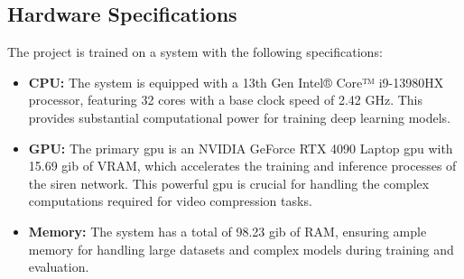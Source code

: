 \documentclass{ioereport}
\begin{document}
\subsection{Hardware Specifications}
The project is trained on a system with the following specifications:
    \begin{itemize}
        \item \textbf{CPU:} The system is equipped with a 13th Gen Intel® Core™ i9-13980HX processor, featuring 32 cores with a base clock speed of 2.42 GHz. This provides substantial computational power for training deep learning models.
        \item \textbf{GPU:} The primary \gls{gpu} is an NVIDIA GeForce RTX 4090 Laptop \gls{gpu} with 15.69 \gls{gib} of VRAM, which accelerates the training and inference processes of the \gls{siren} network. This powerful \gls{gpu} is crucial for handling the complex computations required for video compression tasks.
        \item \textbf{Memory:} The system has a total of 98.23 \gls{gib} of RAM, ensuring ample memory for handling large datasets and complex models during training and evaluation.
    \end{itemize}
\end{document}
